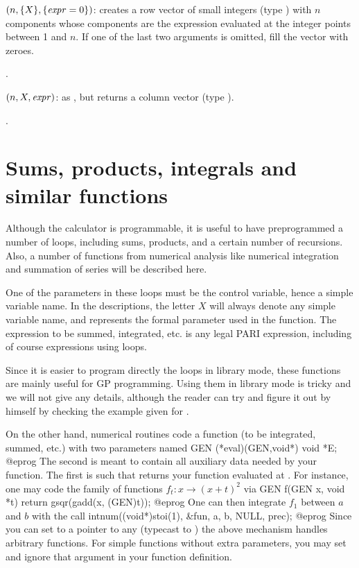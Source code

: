 $(n,\{X\},\{\hbox{\it expr\/}=0\})$: creates a row vector of small integers (type
) with $n$ components whose components are the expression
 evaluated at the integer points between 1 and $n$. If one of the
last two arguments is omitted, fill the vector with zeroes.

.

$(n,X,\hbox{\it expr\/})$: as , but returns a
column vector (type ).

.

\section{Sums, products, integrals and similar functions}
\label{se:sums}

Although the  calculator is programmable, it is useful to have
preprogrammed a number of loops, including sums, products, and a certain
number of recursions. Also, a number of functions from numerical analysis
like numerical integration and summation of series will be described here.

One of the parameters in these loops must be the control variable, hence a
simple variable name. In the descriptions, the letter $X$ will always denote
any simple variable name, and represents the formal parameter used in the
function. The expression to be summed, integrated, etc. is any legal PARI
expression, including of course expressions using loops.

Since it is easier to program directly the loops in library mode, these
functions are mainly useful for GP programming. Using them in library mode is
tricky and we will not give any details, although the reader can try and figure
it out by himself by checking the example given for .

On the other hand, numerical routines code a function (to be integrated,
summed, etc.) with two parameters named
\bprog
  GEN (*eval)(GEN,void*)
  void *E;
@eprog\noindent
The second is meant to contain all auxiliary data needed by your function.
The first is such that  returns your function evaluated at
. For instance, one may code the family of functions
$f_t: x \to (x+t)^2$ via
\bprog
GEN f(GEN x, void *t) { return gsqr(gadd(x, (GEN)t)); }
@eprog\noindent
One can then integrate $f_1$ between $a$ and $b$ with the call
\bprog
intnum((void*)stoi(1), &fun, a, b, NULL, prec);
@eprog\noindent
Since you can set  to a pointer to any  (typecast to
) the above mechanism handles arbitrary functions. For simple
functions without extra parameters, you may set  and ignore
that argument in your function definition.


